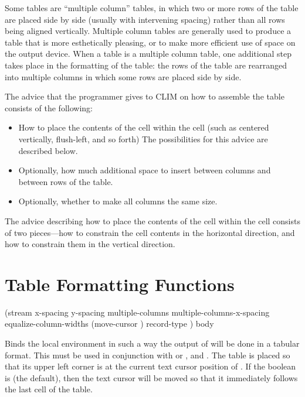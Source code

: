 Some tables are ``multiple column'' tables, in which two or more rows of the
table are placed side by side (usually with intervening spacing) rather than
all rows being aligned vertically.  Multiple column tables are generally used
to produce a table that is more esthetically pleasing, or to make more
efficient use of space on the output device.  When a table is a multiple
column table, one additional step takes place in the formatting of the table:
the rows of the table are rearranged into multiple columns in which some rows
are placed side by side.

The advice that the programmer gives to CLIM on how to assemble the table
consists of the following:
\begin{itemize}
\item How to place the contents of the cell within the cell (such as centered
vertically, flush-left, and so forth)  The possibilities for this advice are
described below.

\item Optionally, how much additional space to insert between columns and
between rows of the table.

\item Optionally, whether to make all columns the same size.
\end{itemize}

The advice describing how to place the contents of the cell within the cell
consists of two pieces---how to constrain the cell contents in the horizontal
direction, and how to constrain them in the vertical direction.

\section {Table Formatting Functions}

 {(\optional stream
                               \key x-spacing y-spacing
                                    multiple-columns multiple-columns-x-spacing
                                    equalize-column-widths 
                                    (move-cursor ) record-type \allow)
                              \body body}

Binds the local environment in such a way the output of  will be done
in a tabular format.  This must be used in conjunction with 
or , and .  The table is placed so
that its upper left corner is at the current text cursor position of
.  If the boolean  is  (the default),
then the text cursor will be moved so that it immediately follows the last cell
of the table.


